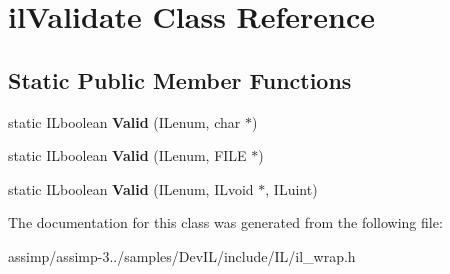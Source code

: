 \hypertarget{classil_validate}{\section{il\+Validate Class Reference}
\label{classil_validate}
}
\subsection*{Static Public Member Functions}
\begin{DoxyCompactItemize}
\item 
\hypertarget{classil_validate_a7a870c444e89b6dcbe05cf05a35f4911}{static I\+Lboolean {\bfseries Valid} (I\+Lenum, char $\ast$)}\label{classil_validate_a7a870c444e89b6dcbe05cf05a35f4911}

\item 
\hypertarget{classil_validate_ae3095a0f6efb478ac460725d44868145}{static I\+Lboolean {\bfseries Valid} (I\+Lenum, F\+I\+L\+E $\ast$)}\label{classil_validate_ae3095a0f6efb478ac460725d44868145}

\item 
\hypertarget{classil_validate_a46b39f0121f6d2b49e2c552b1d820380}{static I\+Lboolean {\bfseries Valid} (I\+Lenum, I\+Lvoid $\ast$, I\+Luint)}\label{classil_validate_a46b39f0121f6d2b49e2c552b1d820380}

\end{DoxyCompactItemize}


The documentation for this class was generated from the following file\+:\begin{DoxyCompactItemize}
\item 
assimp/assimp-\/3../samples/\+Dev\+I\+L/include/\+I\+L/il\+\_\+wrap.\+h\end{DoxyCompactItemize}

